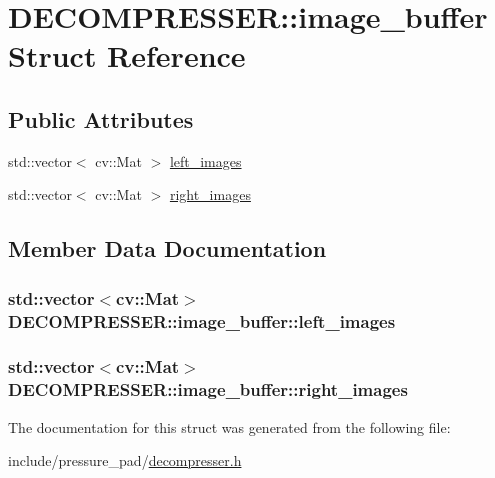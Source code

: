 \hypertarget{struct_d_e_c_o_m_p_r_e_s_s_e_r_1_1image__buffer}{\section{D\-E\-C\-O\-M\-P\-R\-E\-S\-S\-E\-R\-:\-:image\-\_\-buffer Struct Reference}
\label{struct_d_e_c_o_m_p_r_e_s_s_e_r_1_1image__buffer}
}
\subsection*{Public Attributes}
\begin{DoxyCompactItemize}
\item 
std\-::vector$<$ cv\-::\-Mat $>$ \hyperlink{struct_d_e_c_o_m_p_r_e_s_s_e_r_1_1image__buffer_a4082bfa755d42f3396063f9919a4cd33}{left\-\_\-images}
\item 
std\-::vector$<$ cv\-::\-Mat $>$ \hyperlink{struct_d_e_c_o_m_p_r_e_s_s_e_r_1_1image__buffer_a928b3cd515851561ccef6a650ebffc34}{right\-\_\-images}
\end{DoxyCompactItemize}


\subsection{Member Data Documentation}
\hypertarget{struct_d_e_c_o_m_p_r_e_s_s_e_r_1_1image__buffer_a4082bfa755d42f3396063f9919a4cd33}{
\subsubsection[{left\-\_\-images}]{\setlength{\rightskip}{0pt plus 5cm}std\-::vector$<$cv\-::\-Mat$>$ D\-E\-C\-O\-M\-P\-R\-E\-S\-S\-E\-R\-::image\-\_\-buffer\-::left\-\_\-images}}\label{struct_d_e_c_o_m_p_r_e_s_s_e_r_1_1image__buffer_a4082bfa755d42f3396063f9919a4cd33}
\hypertarget{struct_d_e_c_o_m_p_r_e_s_s_e_r_1_1image__buffer_a928b3cd515851561ccef6a650ebffc34}{
\subsubsection[{right\-\_\-images}]{\setlength{\rightskip}{0pt plus 5cm}std\-::vector$<$cv\-::\-Mat$>$ D\-E\-C\-O\-M\-P\-R\-E\-S\-S\-E\-R\-::image\-\_\-buffer\-::right\-\_\-images}}\label{struct_d_e_c_o_m_p_r_e_s_s_e_r_1_1image__buffer_a928b3cd515851561ccef6a650ebffc34}


The documentation for this struct was generated from the following file\-:\begin{DoxyCompactItemize}
\item 
include/pressure\-\_\-pad/\hyperlink{decompresser_8h}{decompresser.\-h}\end{DoxyCompactItemize}
